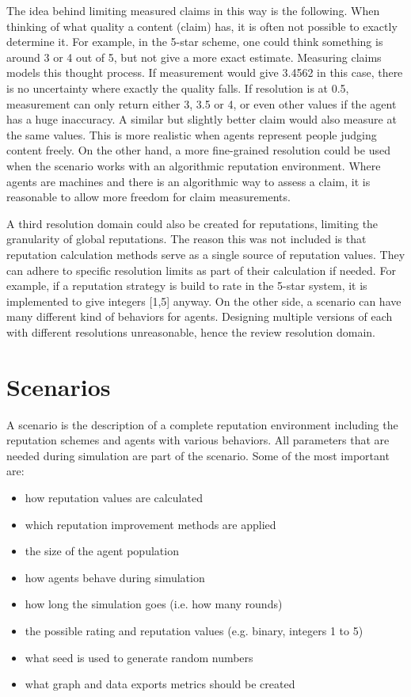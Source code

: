 \documentclass[%
    ]{\PathToTumTemplate/thesis/tum_thesis}
\begin{document}
The idea behind limiting measured claims in this way is the following.
When thinking of what quality a content (claim) has, it is often not possible to exactly determine it.
For example, in the 5-star scheme, one could think something is around 3 or 4 out of 5, but not give a more exact estimate.
Measuring claims models this thought process.
If measurement would give 3.4562 in this case, there is no uncertainty where exactly the quality falls.
If resolution is at 0.5, measurement can only return either 3, 3.5 or 4, or even other values if the agent has a huge inaccuracy.
A similar but slightly better claim would also measure at the same values.
This is more realistic when agents represent people judging content freely.
On the other hand, a more fine-grained resolution could be used when the scenario works with an algorithmic reputation environment.
Where agents are machines and there is an algorithmic way to assess a claim, it is reasonable to allow more freedom for claim measurements.

A third resolution domain could also be created for reputations, limiting the granularity of global reputations.
The reason this was not included is that reputation calculation methods serve as a single source of reputation values.
They can adhere to specific resolution limits as part of their calculation if needed.
For example, if a reputation strategy is build to rate in the 5-star system, it is implemented to give integers [1,5] anyway.
On the other side, a scenario can have many different kind of behaviors for agents.
Designing multiple versions of each with different resolutions unreasonable, hence the review resolution domain.



\section{Scenarios}\label{sec:scenario}
A \gls{scenario} is the description of a complete reputation environment including the reputation schemes and agents with various behaviors.
All parameters that are needed during simulation are part of the scenario.
Some of the most important are:
\begin{itemize}
	\item how reputation values are calculated
	\item which reputation improvement methods are applied
	\item the size of the agent population
	\item how agents behave during simulation
	\item how long the simulation goes (i.e. how many rounds)
	\item the possible rating and reputation values (e.g. binary, integers 1 to 5)
	\item what seed is used to generate random numbers
	\item what graph and data exports metrics should be created
\end{itemize}
\end{document}
